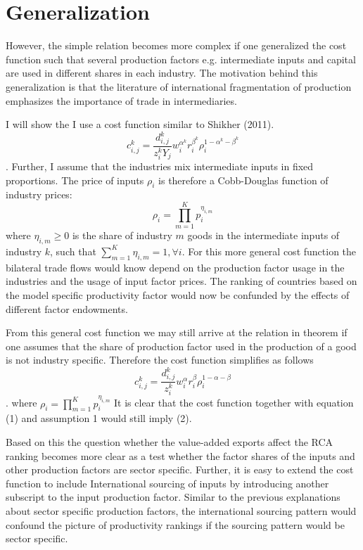 \section{Generalization}
However, the simple relation becomes more complex if one generalized the cost function such that several production factors e.g. intermediate inputs and capital are used in different shares in each industry. The motivation behind this generalization is that the literature of international fragmentation of production emphasizes the importance of trade in intermediaries. \par
I will show the I use a cost function similar to Shikher (2011).  \[ c^k_{i,j}=\frac{d^k_{i,j}}{z_{i}^k Y_j} w^{\alpha^k}_i r^{\beta^k}_i \rho^{1-\alpha^k-\beta^k}_{i} \]. Further, I assume that the industries mix intermediate inputs in fixed proportions. The price of inputs $\rho_i$ is therefore a Cobb-Douglas function of industry prices:
\[\rho_{i}= \prod\limits_{m=1}^{K}  p^{\eta_{i,m}}_{i}  \] where $\eta_{i,m} \geq 0$ is the share of industry $m$ goods in the intermediate inputs of industry $k$, such that $\sum_{m=1}^K \eta_{i,m}=1, \forall i$.  For this more general cost function the bilateral trade flows would know depend on the production factor usage in the industries and the usage of input factor prices. The ranking of countries based on the model specific productivity factor would now be confunded by the effects of different factor endowments.  
\par From this general cost function we may still arrive at the relation in theorem if one assumes that the share of production factor used in the production of a good  is not industry specific. Therefore the cost function simplifies as follows  \[ c^k_{i,j}=\frac{d^k_{i,j}}{z_{i}^k } w^{\alpha}_i r^{\beta}_i \rho^{1-\alpha-\beta}_{i} \]. where
$\rho_{i}= \prod\limits_{m=1}^{K}  p^{\eta_{i,m}}_{i} $ It is clear that the cost function together with equation (1) and assumption 1 would still imply (2). \par Based on this the question whether the value-added exports affect the  RCA ranking becomes more clear as a test whether the factor shares of the inputs and other production factors are sector specific. Further, it is easy to extend the cost function to include International sourcing of inputs by introducing another subscript to the input production factor.  Similar to the previous explanations about sector specific production factors, the international sourcing pattern would confound the picture of productivity rankings if the sourcing pattern would be sector specific. 
